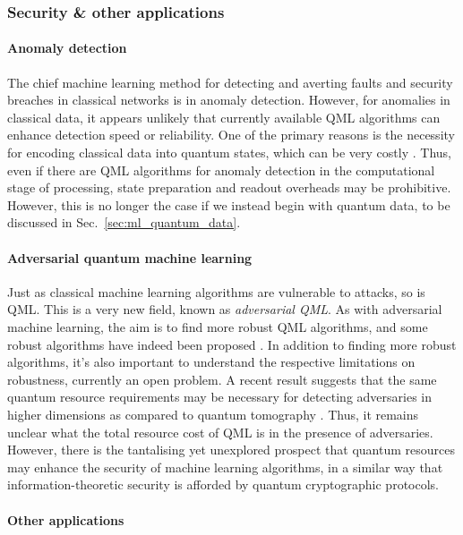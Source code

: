 \subsubsection{Security \& other applications}

\paragraph{Anomaly detection}

The chief machine learning method for detecting and averting faults and security breaches in classical networks is in anomaly detection. However, for anomalies in classical data, it appears unlikely that currently available QML algorithms can enhance detection speed or reliability. One of the primary reasons is the necessity for encoding classical data into quantum states, which can be very costly \cite{bib:aaronson2015read}. Thus, even if there are QML algorithms for anomaly detection in the computational stage of processing, state preparation and readout overheads may be prohibitive. However, this is no longer the case if we instead begin with quantum data, to be discussed in Sec.~\ref{sec:ml_quantum_data}.

\paragraph{Adversarial quantum machine learning}

Just as classical machine learning algorithms are vulnerable to attacks, so is QML. This is a very new field, known as \textit{adversarial QML}. As with adversarial machine learning, the aim is to find more robust QML algorithms, and some robust algorithms have indeed been proposed \cite{bib:wiebe2018hardening}. In addition to finding more robust algorithms, it's also important to understand the respective limitations on robustness, currently an open problem. A recent result suggests that the same quantum resource requirements may be necessary for detecting adversaries in higher dimensions as compared to quantum tomography \cite{bib:advql}. Thus, it remains unclear what the total resource cost of QML is in the presence of adversaries. However, there is the tantalising yet unexplored prospect that quantum resources may enhance the security of machine learning algorithms, in a similar way that information-theoretic security is afforded by quantum cryptographic protocols.

\paragraph{Other applications}

